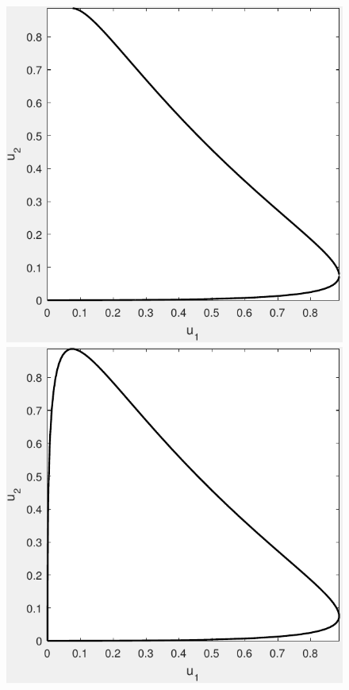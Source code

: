 \begin{figure}[ht]
\begin{minipage}[b]{0.3\linewidth}
				\includegraphics[width=\textwidth]{GammaTrace02}
			\end{minipage}
			\begin{minipage}[b]{0.3\linewidth}
				\includegraphics[width=\textwidth]{GammaTrace03}

\end{minipage}
\end{figure}
